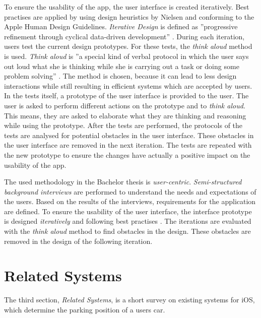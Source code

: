 To ensure the usability of the app, the user interface is created iteratively. Best practises are applied by using design heuristics by Nielsen and conforming to the Apple Human Design Guidelines. \textit{Iterative Design} is defined as ''progressive refinement through cyclical data-driven development'' \cite{goodman2012observing}. During each iteration, users test the current design prototypes. For these tests, the \textit{think aloud} method is used. \textit{Think aloud} is ''a special kind of verbal protocol in which the user says out loud what she is thinking while she is carrying out a task or doing some problem solving'' \cite{nielsen1994usability}. The method is chosen, because it can lead to less design interactions while still resulting in efficient systems which are accepted by users. In the tests itself, a prototype of the user interface is provided to the user. The user is asked to perform different actions on the prototype and to \textit{think aloud}. This means, they are asked to elaborate what they are thinking and reasoning while using the prototype. After the tests are performed, the protocols of the tests are analysed for potential obstacles in the user interface. These obstacles in the user interface are removed in the next iteration. The tests are repeated with the new prototype to ensure the changes have actually a positive impact on the usability of the app. \cite{heurisitcNielsen} \cite{apple:interfaceguidliines} \cite{Abras2004} \cite{jaspers2004think} \cite{goodman2012observing} \cite{nielsen1994usability}

The used methodology in the Bachelor thesis is \textit{user-centric}. \textit{Semi-structured background interviews} are performed to understand the needs and expectations of the users. Based on the results of the interviews, requirements for the application are defined. To ensure the usability of the user interface, the interface prototype is designed \textit{iteratively} and following best practises . The iterations are evaluated with the \textit{think aloud} method to find obstacles in the design. These obstacles are removed in the design of the following iteration. \cite{wilson2013interview} \cite{Abras2004} \cite{heurisitcNielsen} \cite{apple:interfaceguidliines}

\section{Related Systems}
The third section, \textit{Related Systems}, is a short survey on existing systems for iOS, which determine the parking position of a users car.


